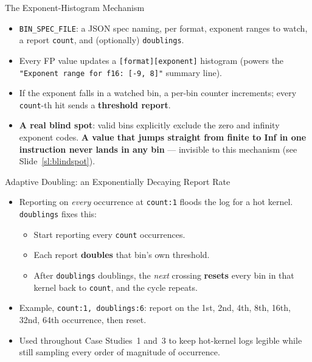\documentclass[aspectratio=169,11pt]{beamer}
\begin{document}
\begin{frame}{The Exponent-Histogram Mechanism}
\label{sl:histogram}
\begin{itemize}
  \item \texttt{BIN\_SPEC\_FILE}: a JSON spec naming, per format, exponent
    ranges to watch, a report \texttt{count}, and (optionally) \texttt{doublings}.
  \item Every FP value updates a \texttt{[format][exponent]} histogram
    (powers the \texttt{"Exponent range for f16: [-9, 8]"} summary line).
  \item If the exponent falls in a watched bin, a per-bin counter increments;
    every \texttt{count}-th hit sends a \textbf{threshold report}.
  \item \textbf{A real blind spot}: valid bins explicitly exclude the zero and
    infinity exponent codes. \textbf{A value that jumps straight from finite
    to Inf in one instruction never lands in any bin} --- invisible to this
    mechanism (see Slide~\ref{sl:blindspot}).
\end{itemize}
\end{frame}

\begin{frame}{Adaptive Doubling: an Exponentially Decaying Report Rate}
\begin{itemize}
  \item Reporting on \emph{every} occurrence at \texttt{count:1} floods the
    log for a hot kernel. \texttt{doublings} fixes this:
  \begin{itemize}
    \item Start reporting every \texttt{count} occurrences.
    \item Each report \textbf{doubles} that bin's own threshold.
    \item After \texttt{doublings} doublings, the \emph{next} crossing
      \textbf{resets} every bin in that kernel back to \texttt{count}, and
      the cycle repeats.
  \end{itemize}
  \item Example, \texttt{count:1, doublings:6}: report on the 1st, 2nd, 4th,
    8th, 16th, 32nd, 64th occurrence, then reset.
  \item Used throughout Case Studies~1 and~3 to keep hot-kernel logs legible
    while still sampling every order of magnitude of occurrence.
\end{itemize}
\end{frame}
\end{document}
